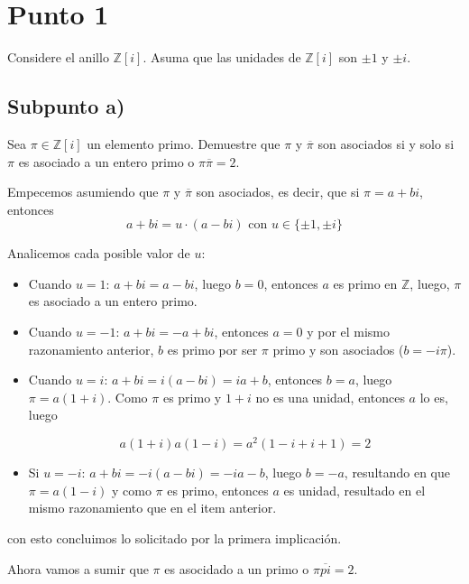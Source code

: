 \documentclass{article}
\begin{document}
  \section{Punto 1}
    Considere el anillo $\mathbb{Z}[i]$. Asuma que las unidades de $\mathbb{Z}[i]$ son 
    $\pm 1$ y $\pm i$.

    \subsection{Subpunto a)}
      Sea $\pi \in \mathbb{Z}[i]$ un elemento primo. Demuestre que $\pi$ y $\overline{\pi}$ 
      son asociados si y solo si $\pi$ es asociado a un entero primo o $\pi \overline{\pi} = 2$.


      Empecemos asumiendo que $\pi$ y $\overline{\pi}$ son asociados, es decir, que si $\pi = a + b i$, entonces 
      \[a + b i = u \cdot (a - bi)\text{ con } u \in \{\pm 1, \pm i\}\]

      Analicemos cada posible valor de $u$: 

      \begin{itemize}

        \item Cuando $u = 1$: $a + bi = a - bi$, luego $b = 0$, entonces $a$ es primo en $\mathbb{Z}$,
          luego, $\pi$ es asociado a un entero primo.

        \item Cuando $u = -1$: $a + bi = -a + bi$, entonces $a = 0$ y por el mismo razonamiento anterior, 
              $b$ es primo por ser $\pi$ primo y son asociados ($b = -i \pi$).

        \item Cuando $u = i$: $a + bi = i(a - bi) = ia + b$, entonces $b = a$, luego $\pi = a(1 + i)$. 
              Como $\pi$ es primo y $1 + i$ no es una unidad, entonces $a$ lo es, luego 

              \[
                a(1 + i) a (1 - i) = a^2 (1 - i + i + 1) = 2
              \]

        \item Si $u = -i$: $a + bi = -i(a - bi) = -ia - b$, luego $b = -a$, resultando en que 
              $\pi = a(1 - i)$ y como $\pi$ es primo, entonces $a$ es unidad, resultado en el mismo 
              razonamiento que en el item anterior.
      \end{itemize}

      con esto concluimos lo solicitado por la primera implicación.

      Ahora vamos a sumir que $\pi$ es asocidado a un primo o $\pi \overline{pi} = 2$.
\end{document}
